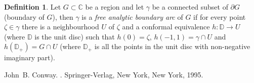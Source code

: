 \documentclass[12pt]{article}
\theoremstyle{theorem}
\theoremstyle{definition}
\newtheorem*{defn}{Definition}
\begin{document}
\begin{defn}
Let $G \subset \mathbb{C}$ be a region and let $\gamma$ be a connected subset of $\partial G$ (boundary of $G$), then $\gamma$ is a {\em free analytic boundary arc} of
$G$ if for every point $\zeta \in \gamma$ there is a neighbourhood $U$ of
$\zeta$ and
a conformal equivalence $h \colon {\mathbb{D}} \to U$ (where ${\mathbb{D}}$ is the unit disc) such that $h(0) = \zeta$, $h(-1,1) = \gamma \cap U$ and
$h({\mathbb{D}}_+) = G \cap U$ (where ${\mathbb{D}}_+$ is all the points
in the unit disc with non-negative imaginary part).
\end{defn}

\begin{thebibliography}{9}
John~B. Conway.
{\em {}}.
Springer-Verlag, New York, New York, 1995.
\end{thebibliography}
\end{document}
